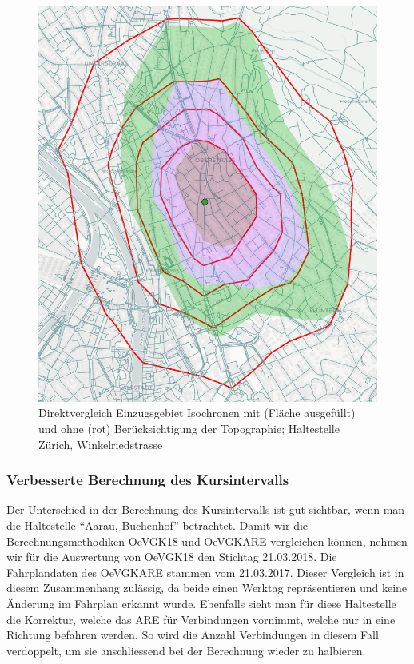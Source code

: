 \begin{figure}[ht]
    \centering
    \includegraphics[width=0.8\linewidth]{technicalreport/img/vergleich_wegfuehrung_isochrone_mit_ohne_topo.png}
    \caption[Direktvergleich Einzugsgebiet Isochronen mit und ohne Topographie]{Direktvergleich Einzugsgebiet Isochronen mit (Fläche ausgefüllt) und ohne (rot) Berücksichtigung der Topographie; Haltestelle Zürich, Winkelriedstrasse}
    \label{fig:vergleich_wegfuehrung_isochrone_mit_ohne_topo}
\end{figure}


\subsubsection{Verbesserte Berechnung des Kursintervalls}

Der Unterschied in der Berechnung des Kursintervalls ist gut sichtbar, wenn man die Haltestelle "`Aarau, Buchenhof"' betrachtet.
Damit wir die Berechnungsmethodiken OeVGK18 und OeVGKARE vergleichen können, nehmen wir für die Auswertung von OeVGK18 den Stichtag 21.03.2018. Die Fahrplandaten des OeVGKARE stammen vom 21.03.2017.
Dieser Vergleich ist in diesem Zusammenhang zulässig, da beide einen Werktag repräsentieren und keine Änderung im Fahrplan erkannt wurde.
Ebenfalls sieht man für diese Haltestelle die Korrektur, welche das \ac{ARE} für Verbindungen vornimmt, welche nur in eine Richtung befahren werden.
So wird die Anzahl Verbindungen in diesem Fall verdoppelt, um sie anschliessend bei der Berechnung wieder zu halbieren.

